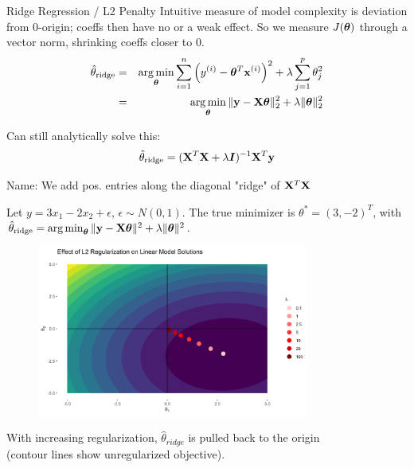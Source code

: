\documentclass[11pt,compress,t,notes=noshow, xcolor=table]{beamer}
\begin{document}
\begin{vbframe}{Ridge Regression / L2 Penalty}
Intuitive measure of model complexity is deviation from 0-origin; coeffs then have no or a weak effect. 
So we measure $J(\bm{\theta})$ through a vector norm, shrinking coeffs closer to 0.\\
\vspace{0.2cm}
\begin{eqnarray*}  
\hat{\theta}_{\text{ridge}} &=& \operatorname*{arg\,min}_{\bm{\theta}} \sum\limits_{i=1}^n \left(y^{(i)} - \bm{\theta}^T \mathbf{x}^{(i)} \right)^2 + \lambda \sum_{j=1}^{p} \theta_j^2 \\
&=& \operatorname*{arg\,min}_{\bm{\theta}} \| \mathbf{y} - \mathbf{X} \bm{\theta} \|_2^2  + \lambda \|\bm{\theta}\|_2^2
\end{eqnarray*}

Can still analytically solve this:
$$\hat{\theta}_{\text{ridge}} = ({\mathbf{X}}^T \mathbf{X}  + \lambda \bm{I})^{-1} \mathbf{X}^T\mathbf{y}$$

Name: We add pos. entries along the diagonal "ridge" of $\mathbf{X}^T \mathbf{X}$

\framebreak 

Let $y=3x_{1} -2x_{2} +\epsilon $, $ \epsilon \sim N( 0,1)$. The true minimizer is $\theta ^{*} =( 3,-2)^{T}$, with $ \hat{\theta}_{\text{ridge}} = \operatorname*{arg\,min}_{\bm{\theta}} \|\mathbf{y} - \mathbf{X} \bm{\theta}\|^2 + \lambda \|\bm{\theta}\|^2 $.

\begin{figure}
\includegraphics[width=0.8\textwidth]{figure/lin_model_regu_02.png}
\end{figure}
\vspace{-0.2cm}
{\small With increasing regularization, $\hat{\theta}_{\textit{ridge}}$ is pulled back to the origin\\ (contour lines show unregularized objective).}


\end{vbframe}
\end{document}

